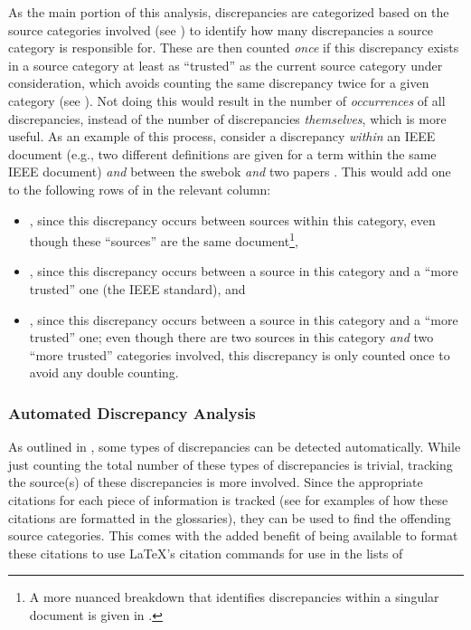As the main portion of this analysis, discrepancies are categorized
based on the source categories involved (see ) to identify how
many discrepancies a source category is responsible for. These
are then counted \emph{once} if this discrepancy exists in a source category at
least as ``trusted'' as the current source category under consideration, which
avoids counting the same discrepancy twice for a given category (see
). Not doing this would result in the number of
\emph{occurrences} of all discrepancies, instead of the number of discrepancies
\emph{themselves}, which is more useful.
As an example of this process, consider a discrepancy \emph{within} an IEEE
document (e.g., two different definitions are given for a term within the same
IEEE document) \emph{and} between the \acs{swebok} \emph{and} two papers%
. This would add one to the following rows of
 in the relevant column:

\begin{itemize}
    \item \textbf{}, since this discrepancy occurs between
          sources within this category, even though these ``sources'' are the
          same document\footnote{A more nuanced breakdown that identifies
              discrepancies within a singular document is given in
              .},
    \item \textbf{}, since this discrepancy occurs between a
          source in this category and a ``more trusted'' one
          (the IEEE standard), and
    \item \textbf{}, since this discrepancy occurs between a
          source in this category and a ``more trusted'' one; even though there
          are two sources in this category \emph{and} two ``more trusted''
          categories involved, this discrepancy is only counted once to avoid
          any double counting.
\end{itemize}

\subsubsection{Automated Discrepancy Analysis}
\label{auto-discrep-analysis}

As outlined in , some types of discrepancies can be detected
automatically. While just counting the total number of these types of
discrepancies is trivial, tracking the source(s) of these discrepancies is more
involved. Since the appropriate citations for each piece of information is
tracked (see  for examples of
how these citations are formatted in the glossaries), they can be used to find
the offending source categories. This comes with the added benefit of being
available to format these citations to use \LaTeX{}'s citation commands for use
in the lists of \autoDiscreps[.]{}

